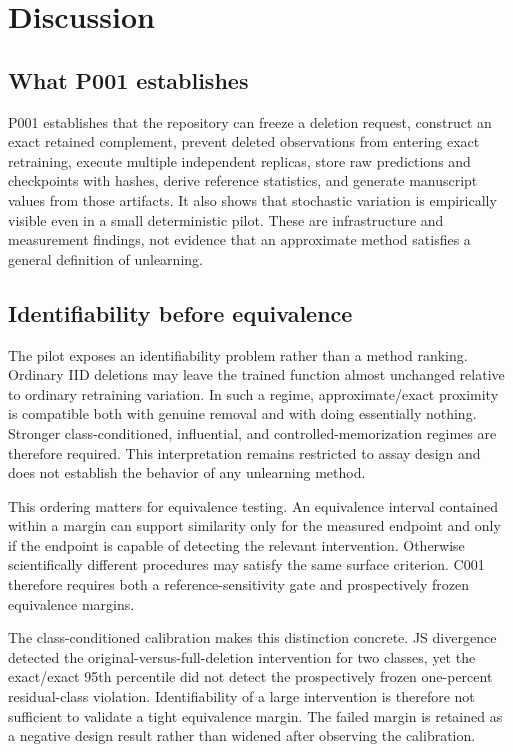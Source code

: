 \section{Discussion}
\subsection{What P001 establishes}
P001 establishes that the repository can freeze a deletion request, construct an exact
retained complement, prevent deleted observations from entering exact retraining, execute
multiple independent replicas, store raw predictions and checkpoints with hashes, derive
reference statistics, and generate manuscript values from those artifacts. It also shows
that stochastic variation is empirically visible even in a small deterministic pilot.
These are infrastructure and measurement findings, not evidence that an approximate
method satisfies a general definition of unlearning.

\subsection{Identifiability before equivalence}
The pilot exposes an identifiability problem rather than a method ranking. Ordinary IID
deletions may leave the trained function almost unchanged relative to ordinary retraining
variation. In such a regime, approximate/exact proximity is compatible both with genuine
removal and with doing essentially nothing. Stronger class-conditioned, influential, and
controlled-memorization regimes are therefore required. This interpretation remains
restricted to assay design and does not establish the behavior of any unlearning method.

This ordering matters for equivalence testing. An equivalence interval contained within a
margin can support similarity only for the measured endpoint and only if the endpoint is
capable of detecting the relevant intervention. Otherwise scientifically different
procedures may satisfy the same surface criterion. C001 therefore requires both a
reference-sensitivity gate and prospectively frozen equivalence margins.

The class-conditioned calibration makes this distinction concrete. JS divergence detected
the original-versus-full-deletion intervention for two classes, yet the exact/exact 95th
percentile did not detect the prospectively frozen one-percent residual-class violation.
Identifiability of a large intervention is therefore not sufficient to validate a tight
equivalence margin. The failed margin is retained as a negative design result rather than
widened after observing the calibration.


